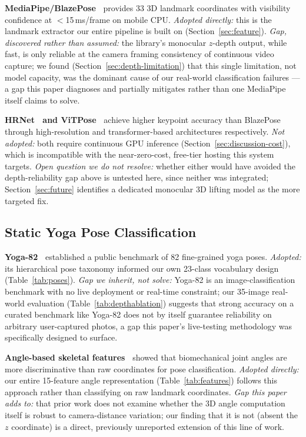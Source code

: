 \documentclass[conference]{IEEEtran}
\begin{document}
\textbf{MediaPipe/BlazePose~\cite{mediapipe_2020}} provides 33 3D landmark
coordinates with visibility confidence at $<$15\,ms/frame on mobile CPU.
\emph{Adopted directly:} this is the landmark extractor our entire pipeline is
built on (Section~\ref{sec:feature}). \emph{Gap, discovered rather than
assumed:} the library's monocular $z$-depth output, while fast, is only
reliable at the camera framing consistency of continuous video capture; we
found (Section~\ref{sec:depth-limitation}) that this single limitation, not
model capacity, was the dominant cause of our real-world classification
failures --- a gap this paper diagnoses and partially mitigates rather than
one MediaPipe itself claims to solve.

\textbf{HRNet~\cite{hrnet2019} and ViTPose~\cite{vitpose2022}} achieve higher
keypoint accuracy than BlazePose through high-resolution and transformer-based
architectures respectively. \emph{Not adopted:} both require continuous GPU
inference (Section~\ref{sec:discussion-cost}), which is incompatible with the
near-zero-cost, free-tier hosting this system targets. \emph{Open question we
do not resolve:} whether either would have avoided the depth-reliability gap
above is untested here, since neither was integrated; Section~\ref{sec:future}
identifies a dedicated monocular 3D lifting model as the more targeted fix.

\subsection{Static Yoga Pose Classification}

\textbf{Yoga-82~\cite{yoga82_2021}} established a public benchmark of 82
fine-grained yoga poses. \emph{Adopted:} its hierarchical pose taxonomy
informed our own 23-class vocabulary design (Table~\ref{tab:poses}).
\emph{Gap we inherit, not solve:} Yoga-82 is an image-classification benchmark
with no live deployment or real-time constraint; our 35-image real-world
evaluation (Table~\ref{tab:depthablation}) suggests that strong accuracy on a
curated benchmark like Yoga-82 does not by itself guarantee reliability on
arbitrary user-captured photos, a gap this paper's live-testing methodology
was specifically designed to surface.

\textbf{Angle-based skeletal features~\cite{angle_yoga_2022}} showed that
biomechanical joint angles are more discriminative than raw coordinates for
pose classification. \emph{Adopted directly:} our entire 15-feature angle
representation (Table~\ref{tab:features}) follows this approach rather than
classifying on raw landmark coordinates. \emph{Gap this paper adds to:} that
prior work does not examine whether the 3D angle computation itself is robust
to camera-distance variation; our finding that it is not (absent the $z$
coordinate) is a direct, previously unreported extension of this line of work.
\end{document}
